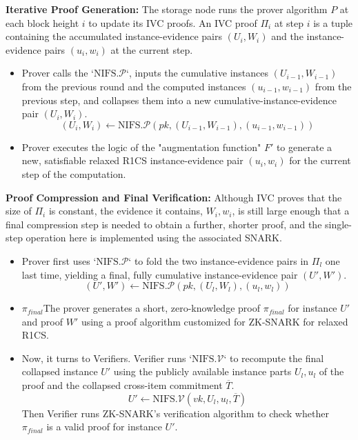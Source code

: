 \documentclass[journal]{IEEEtran}
\begin{document}
\textbf{Iterative Proof Generation: }
The storage node runs the prover algorithm $P$ at each block height $i$ to update its IVC proofs. An IVC proof $\Pi_i$ at step $i$ is a tuple containing the accumulated instance-evidence pairs $(U_i, W_i)$ and the instance-evidence pairs $(u_i, w_i)$ at the current step.
\begin{itemize}
    \item 
    Prover calls the `$\text{NIFS.}\mathcal{P}$`, inputs the cumulative instances $(U_{i-1}, W_{i-1})$ from the previous round and the computed instances $(u_{i-1}, w_{i-1})$ from the previous step, and collapses them into a new cumulative-instance-evidence pair $(U_i, W_i)$.
    \begin{equation}
    (U_i, W_i) \leftarrow \text{NIFS.}\mathcal{P}(pk, (U_{i-1}, W_{i-1}), (u_{i-1}, w_{i-1}))
    \end{equation}
    \item 
    Prover executes the logic of the "augmentation function" $F'$ to generate a new, satisfiable relaxed R1CS instance-evidence pair $(u_i, w_i)$ for the current step of the computation.
\end{itemize}


\textbf{Proof Compression and Final Verification: } 
Although IVC proves that the size of $\Pi_i$ is constant, the evidence it contains, $W_i, w_i$, is still large enough that a final compression step is needed to obtain a further, shorter proof, and the single-step operation here is implemented using the associated SNARK.
\begin{itemize}
    \item 
    Prover first uses `$\text{NIFS.}\mathcal{P}$` to fold the two instance-evidence pairs in $\Pi_l$ one last time, yielding a final, fully cumulative instance-evidence pair $(U', W')$.
    \begin{equation}
    (U', W') \leftarrow \text{NIFS.}\mathcal{P}(pk, (U_l, W_l), (u_l, w_l))
    \end{equation}
    \item 
    $\pi_{final}$The prover generates a short, zero-knowledge proof $\pi_{final}$ for instance $U'$ and proof $W'$ using a proof algorithm customized for ZK-SNARK for relaxed R1CS.
    \item 
    Now, it turns to Verifiers. Verifier runs `$\text{NIFS.}\mathcal{V}$` to recompute the final collapsed instance $U'$ using the publicly available instance parts $U_l, u_l$ of the proof and the collapsed cross-item commitment $\overline{T}$.
    \begin{equation}
    U' \leftarrow \text{NIFS.}\mathcal{V}(vk, U_l, u_l, \overline{T})
    \end{equation}
    Then Verifier runs ZK-SNARK's verification algorithm to check whether $\pi_{final}$ is a valid proof for instance $U'$.
\end{itemize}
\end{document}
